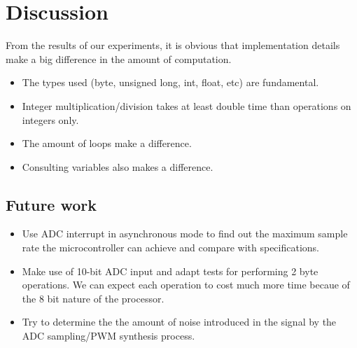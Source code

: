 
\section{Discussion}
\label{sec:discussion}

From the results of our experiments, it is obvious that implementation details
make a big difference in the amount of computation. 

\begin{itemize}
    \item The types used (byte, unsigned long, int, float, etc) are
    fundamental.
    \item Integer multiplication/division takes at least double time than
    operations on integers only.
    \item The amount of loops make a difference.
    \item Consulting variables also makes a difference.
\end{itemize}



\subsection{Future work}

\begin{itemize}
    \item Use ADC interrupt in asynchronous mode to find out the maximum sample rate
    the microcontroller can achieve and compare with specifications.
    \item Make use of 10-bit ADC input and adapt tests for performing 2 byte operations. We can expect each operation to cost much more time becaue of the 8 bit nature of the processor.
     \item Try to determine the the amount of noise introduced in the signal by the ADC sampling/PWM synthesis process.
\end{itemize}
